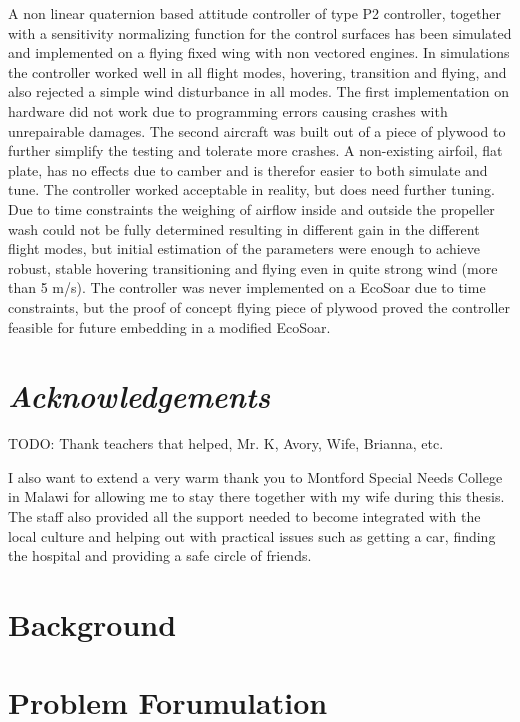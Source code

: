 \documentclass{article}
\begin{document}
\abstract
A non linear quaternion based attitude controller of type P2 controller, together with a sensitivity normalizing function for the control surfaces has been simulated and implemented on a flying fixed wing with non vectored engines.
In simulations the controller worked well in all flight modes, hovering, transition and flying, and also rejected a simple wind disturbance in all modes.
The first implementation on hardware did not work due to programming errors causing crashes with unrepairable damages.
The second aircraft was built out of a piece of plywood to further simplify the testing and tolerate more crashes.
A non-existing airfoil, flat plate, has no effects due to camber and is therefor easier to both simulate and tune.
The controller worked acceptable in reality, but does need further tuning.
Due to time constraints the weighing of airflow inside and outside the propeller wash could not be fully determined resulting in different gain in the different flight modes, but initial estimation of the parameters were enough to achieve robust, stable hovering transitioning and flying even in quite strong wind (more than 5 m/s).
The controller was never implemented on a EcoSoar due to time constraints, but the proof of concept flying piece of plywood proved the controller feasible for future embedding in a modified EcoSoar. 


\newpage
\section*{\textit{Acknowledgements}}

TODO: Thank teachers that helped, Mr. K, Avory, Wife, Brianna, etc.

I also want to extend a very warm thank you to Montford Special Needs College in Malawi for allowing me to stay there together with my wife during this thesis.
The staff also provided all the support needed to become integrated with the local culture and helping out with practical issues such as getting a car, finding the hospital and providing a safe circle of friends.

\newpage

\tableofcontents

\newpage

\newpage

\section{Background}


\section{Problem Forumulation}

\end{document}
